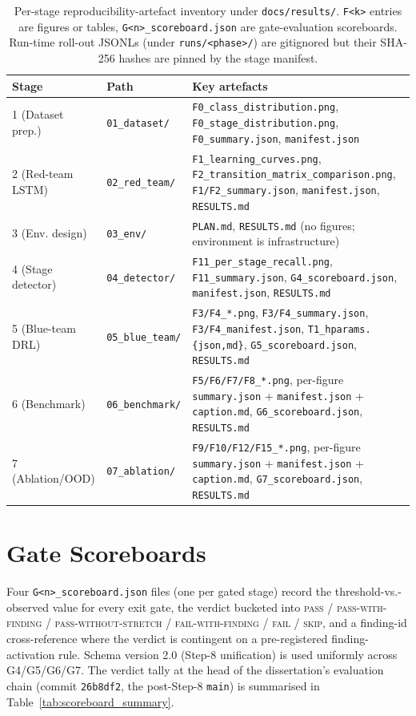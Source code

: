 \begin{table}[!htbp]
\centering
\caption{Per-stage reproducibility-artefact inventory under \texttt{docs/results/}. \texttt{F<k>} entries are figures or tables, \texttt{G<n>\_scoreboard.json} are gate-evaluation scoreboards. Run-time roll-out JSONLs (under \texttt{runs/<phase>/}) are gitignored but their SHA-256 hashes are pinned by the stage manifest.}
\label{tab:manifest_inventory}
\begin{tabular}{l l l}
\hline
Stage & Path & Key artefacts \\
\hline
1 (Dataset prep.) & \texttt{01\_dataset/} & \texttt{F0\_class\_distribution.png}, \texttt{F0\_stage\_distribution.png}, \texttt{F0\_summary.json}, \texttt{manifest.json} \\
2 (Red-team LSTM) & \texttt{02\_red\_team/} & \texttt{F1\_learning\_curves.png}, \texttt{F2\_transition\_matrix\_comparison.png}, \texttt{F1/F2\_summary.json}, \texttt{manifest.json}, \texttt{RESULTS.md} \\
3 (Env. design) & \texttt{03\_env/} & \texttt{PLAN.md}, \texttt{RESULTS.md} (no figures; environment is infrastructure) \\
4 (Stage detector) & \texttt{04\_detector/} & \texttt{F11\_per\_stage\_recall.png}, \texttt{F11\_summary.json}, \texttt{G4\_scoreboard.json}, \texttt{manifest.json}, \texttt{RESULTS.md} \\
5 (Blue-team DRL) & \texttt{05\_blue\_team/} & \texttt{F3/F4\_*.png}, \texttt{F3/F4\_summary.json}, \texttt{F3/F4\_manifest.json}, \texttt{T1\_hparams.\{json,md\}}, \texttt{G5\_scoreboard.json}, \texttt{RESULTS.md} \\
6 (Benchmark) & \texttt{06\_benchmark/} & \texttt{F5/F6/F7/F8\_*.png}, per-figure \texttt{summary.json} + \texttt{manifest.json} + \texttt{caption.md}, \texttt{G6\_scoreboard.json}, \texttt{RESULTS.md} \\
7 (Ablation/OOD) & \texttt{07\_ablation/} & \texttt{F9/F10/F12/F15\_*.png}, per-figure \texttt{summary.json} + \texttt{manifest.json} + \texttt{caption.md}, \texttt{G7\_scoreboard.json}, \texttt{RESULTS.md} \\
\hline
\end{tabular}
\end{table}

\section{Gate Scoreboards}\label{app:scoreboards}
Four \texttt{G<n>\_scoreboard.json} files (one per gated stage) record the threshold-vs.-observed value for every exit gate, the verdict bucketed into \textsc{pass} / \textsc{pass-with-finding} / \textsc{pass-without-stretch} / \textsc{fail-with-finding} / \textsc{fail} / \textsc{skip}, and a finding-id cross-reference where the verdict is contingent on a pre-registered finding-activation rule. Schema version 2.0 (Step-8 unification) is used uniformly across G4/G5/G6/G7. The verdict tally at the head of the dissertation's evaluation chain (commit \texttt{26b8df2}, the post-Step-8 \texttt{main}) is summarised in Table~\ref{tab:scoreboard_summary}.

